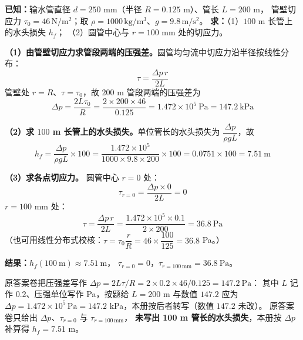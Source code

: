 \begin{jie}
\textbf{已知：}输水管直径 $d=250$ mm（半径 $R=0.125$ m）、管长 $L=200$ m，
管壁切应力 $\tau_0=46\,\mathrm{N/m^{2}}$；取 $\rho=1000\,\mathrm{kg/m^{3}}$、$g=9.8\,\mathrm{m/s^{2}}$。
\textbf{求：}（1）$100$ m 长管上的水头损失 $h_f$；
（2）圆管中心与 $r=100$ mm 处的切应力。

\textbf{（1）由管壁切应力求管段两端的压强差。}圆管均匀流中切应力沿半径按线性分布：
\[
\tau=\frac{\Delta p\,r}{2L}
\]
管壁处 $r=R$、$\tau=\tau_0$，故 $200$ m 管段两端的压强差为
\[
\Delta p=\frac{2L\tau_0}{R}=\frac{2\times200\times46}{0.125}
=1.472\times10^{5}\ \mathrm{Pa}=147.2\ \mathrm{kPa}
\]

\textbf{（2）求 $100$ m 长管上的水头损失。}单位管长的水头损失为 $\dfrac{\Delta p}{\rho gL}$，故
\[
h_f=\frac{\Delta p}{\rho gL}\times100
=\frac{1.472\times10^{5}}{1000\times9.8\times200}\times100
=0.0751\times100=7.51\ \mathrm{m}
\]

\textbf{（3）求各点切应力。}
圆管中心 $r=0$ 处：
\[
\tau_{r=0}=\frac{\Delta p\times0}{2L}=0
\]
$r=100$ mm 处：
\[
\tau=\frac{\Delta p\,r}{2L}=\frac{1.472\times10^{5}\times0.1}{2\times200}=36.8\ \mathrm{Pa}
\]
（也可用线性分布式校核：$\tau=\tau_0\dfrac{r}{R}=46\times\dfrac{100}{125}=36.8$ Pa。）

\textbf{结果：}$\boxed{h_f(100\ \mathrm{m})\approx7.51\ \mathrm{m}}$，
$\boxed{\tau_{r=0}=0}$，$\boxed{\tau_{r=100\,\mathrm{mm}}=36.8\ \mathrm{Pa}}$。
\end{jie}

\begin{tishi}
原答案卷把压强差写作 $\Delta p=2L\tau/R=2\times0.2\times46/0.125=147.2\ \mathrm{Pa}$：
其中 $L$ 记作 $0.2$、压强单位写作 Pa，按题给 $L=200$ m 与数值 $147.2$ 应为
$\Delta p=1.472\times10^{5}\,\mathrm{Pa}=147.2$ kPa，本册按后者转写（数值 $147.2$ 未改）。
原答案卷只给出 $\Delta p$、$\tau_{r=0}$ 与 $\tau_{r=100\,\mathrm{mm}}$，
\textbf{未写出 100 m 管长的水头损失}，本册按 $\Delta p$ 补算得 $h_f=7.51$ m。
\end{tishi}


